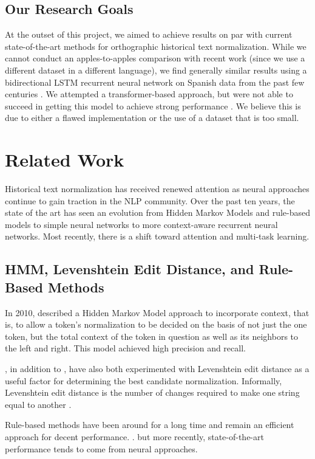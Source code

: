 \documentclass[11pt,a4paper]{article}
\begin{document}
\subsection{Our Research Goals}
At the outset of this project, we aimed to achieve results on par with current state-of-the-art methods for orthographic historical text normalization. While we cannot conduct an apples-to-apples comparison with recent work (since we use a different dataset in a different language), we find generally similar results using a bidirectional LSTM recurrent neural network on Spanish data from the past few centuries \cite{graves_framewise_2005}. We attempted a transformer-based approach, but were not able to succeed in getting this model to achieve strong performance \cite{vaswani_attention_2017}. We believe this is due to either a flawed implementation or the use of a dataset that is too small.

\section{Related Work}
Historical text normalization has received renewed attention as neural approaches continue to gain traction in the NLP community. Over the past ten years, the state of the art has seen an evolution from Hidden Markov Models and rule-based models to simple neural networks to more context-aware recurrent neural networks. Most recently, there is a shift toward attention and multi-task learning.

\subsection{HMM, Levenshtein Edit Distance, and Rule-Based Methods}
In 2010, \citeauthor{jurish_more_2010} described a Hidden Markov Model approach to incorporate context, that is, to allow a token's normalization to be decided on the basis of not just the one token, but the total context of the token in question as well as its neighbors to the left and right. This model achieved high precision and recall.

\citeauthor{jurish_comparing_2010}, in addition to \citeauthor{pettersson_normalisation_2013}, have also both experimented with Levenshtein edit distance as a useful factor for determining the best candidate normalization. Informally, Levenshtein edit distance is the number of changes required to make one string equal to another \cite{levenshtein_binary_1966}. 

Rule-based methods have been around for a long time and remain an efficient approach for decent performance. \cite{bollmann_rule-based_2011, pettersson_spelling_2016, zeldes_nlp_2016, schneider_comparing_2017}. but more recently, state-of-the-art performance tends to come from neural approaches.
\end{document}

